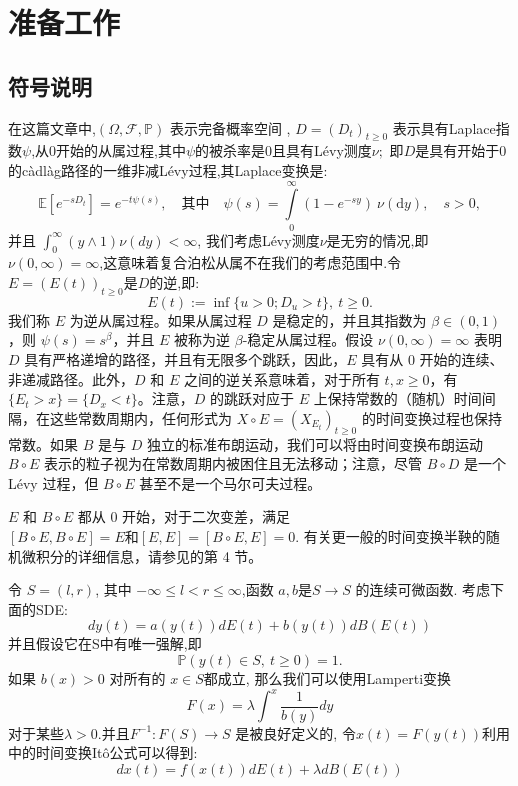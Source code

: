 

\chapter{准备工作}\label{chap:LaTeXEnv}

\section{符号说明}
在这篇文章中,$(\Omega,\mathcal{F},\mathbb{P})$ 表示完备概率空间 , $D=(D_t)_{t\geq0}$ 表示具有Laplace指数$\psi$,从0开始的从属过程,其中$\psi$的被杀率是0且具有Lévy测度$\nu;$ 即$D$是具有开始于0的càdlàg路径的一维非减Lévy过程,其Laplace变换是:
$$\mathbb{E}[e^{-sD_t}]=e^{-t\psi(s)},\quad\text{其中}\quad\psi(s)=\int\limits_0^\infty(1-e^{-sy})\:\nu(\text{d}y),\quad s>0,$$
并且 $\int_0^\infty(y\wedge1)\nu(dy) < \infty$,
我们考虑Lévy测度$\nu$是无穷的情况,即$\nu ( 0, \infty ) = \infty$,这意味着复合泊松从属不在我们的考虑范围中.令 $E=(E(t))_{t\geq0}$是$D$的逆,即:
$$E(t):=\inf\{u>0;D_u>t\},\:t\geq0.$$
我们称 \( E \) 为逆从属过程。如果从属过程 \( D \) 是稳定的，并且其指数为 \( \beta \in (0,1) \)，则 \( \psi(s) = s^{\beta} \)，并且 \( E \) 被称为逆 \( \beta \)-稳定从属过程。假设 \( \nu(0,\infty) = \infty \) 表明 \( D \) 具有严格递增的路径，并且有无限多个跳跃，因此，\( E \) 具有从 0 开始的连续、非递减路径。此外，\( D \) 和 \( E \) 之间的逆关系意味着，对于所有 \( t, x \geq 0 \)，有$\{E_t > x\} = \{D_x < t\}$。注意，\( D \) 的跳跃对应于 \( E \) 上保持常数的（随机）时间间隔，在这些常数周期内，任何形式为 \( X \circ E = (X_{E_t})_{t \geq 0} \) 的时间变换过程也保持常数。如果 \( B \) 是与 \( D \) 独立的标准布朗运动，我们可以将由时间变换布朗运动 \( B \circ E \) 表示的粒子视为在常数周期内被困住且无法移动；注意，尽管 \( B \circ D \) 是一个 Lévy 过程，但 \( B \circ E \) 甚至不是一个马尔可夫过程。

\( E \) 和 \( B \circ E \) 都从 0 开始，对于二次变差，满足$
[B \circ E, B \circ E] = E  \text{和} [E, E] = [B \circ E, E] = 0.$
有关更一般的时间变换半鞅的随机微积分的详细信息，请参见\cite{kobayashi2011stochastic}的第 4 节。

令 $S=(l,r)$, 其中 $-\infty\leq l<r\leq\infty$,函数 $a,b$是$S\to S$ 的连续可微函数. 考虑下面的SDE:
\begin{equation}\label{original SDE}
	dy(t)=a(y(t))dE(t)+b(y(t))dB(E(t))
\end{equation}
并且假设它在S中有唯一强解,即
$$\mathbb{P}(y(t)\in S,\:t\geq0)=1.$$
如果 $b(x)>0$ 对所有的 $x\in S$都成立, 那么我们可以使用Lamperti变换
\begin{equation}\label{Lamperti}
	F(x)=\lambda\int^x\frac1{b(y)}dy
\end{equation}
对于某些$\lambda>0.$并且$F^{-1}:F(S)\to S$ 是被良好定义的, 令$x(t)=F(y(t))$利用\cite{umarov2018beyond}中的时间变换It\^{o}公式可以得到:
\begin{equation}\label{basic SDE}
	dx(t)=f(x(t))dE(t) + \lambda dB(E(t)) 
\end{equation}

